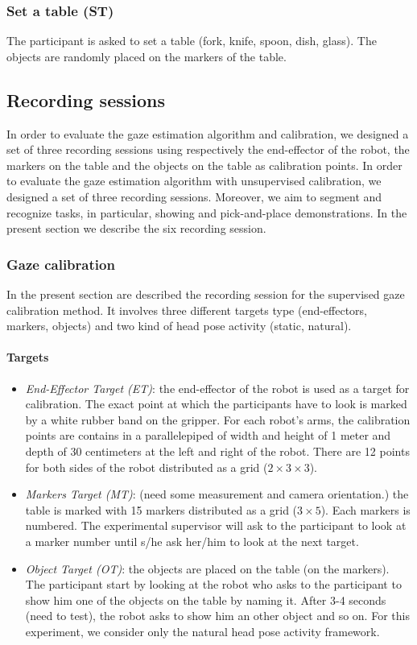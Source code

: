 \documentclass[11pt,a4paper]{article}
\begin{document}
\subsubsection{Set a table (ST)}
The participant is asked to set a table (fork, knife, spoon, dish, glass). The objects are randomly placed on the markers of the table.

\subsection{Recording sessions}
In order to evaluate the gaze estimation algorithm and calibration, we designed a set of three recording sessions using respectively the end-effector of the robot, the markers on the table and the objects on the table as calibration points. In order to evaluate the gaze estimation algorithm with unsupervised calibration, we designed a set of three recording sessions. Moreover, we aim to segment and recognize tasks, in particular, showing and pick-and-place demonstrations. In the present section we describe the six recording session.
\subsubsection{Gaze calibration}
In the present section are described the recording session for the supervised gaze calibration method. It involves three different targets type (end-effectors, markers, objects) and two kind of head pose activity (static, natural).
\paragraph{Targets}
\begin{itemize}
\item \textit{End-Effector Target (ET)}: the end-effector of the robot is used as a target for calibration. The exact point at which the participants have to look is marked by a white rubber band on the gripper. For each robot's arms, the calibration points are contains in a parallelepiped of width and height of 1 meter and depth of 30 centimeters at the left and right of the robot. There are 12 points for both sides of the robot distributed as a grid ($2 \times 3 \times 3$).
\item \textit{Markers Target (MT)}: (need some measurement and camera orientation.) the table is marked with 15 markers distributed as a grid ($3 \times 5$). Each markers is numbered. The experimental supervisor will ask to the participant to look at a marker number until s/he ask her/him to look at the next target.
\item \textit{Object Target (OT)}: the objects are placed on the table (on the markers). The participant start by looking at the robot who asks to the participant to show him one of the objects on the table by naming it. After 3-4 seconds (need to test), the robot asks to show him an other object and so on. For this experiment, we consider only the natural head pose activity framework.
\end{itemize}
\end{document}
